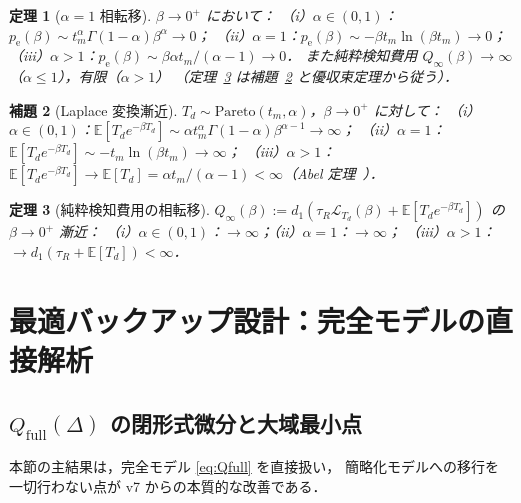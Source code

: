 \documentclass[12pt,a4paper]{article}
\theoremstyle{plain}
\newtheorem{theorem}{定理}[section]
\newtheorem{lemma}[theorem]{補題}
\theoremstyle{definition}
\theoremstyle{remark}
\newcommand{\E}{\mathbb{E}}
\newcommand{\calL}{\mathcal{L}}
\newcommand{\pe}{p_{\mathrm{e}}}
\newcommand{\Qf}{Q_{\mathrm{full}}}
\newcommand{\Qinf}{Q_{\infty}}
\begin{document}
\begin{theorem}[$\alpha=1$ 相転移]\label{thm:phase}
$\beta\to0^+$ において：
（i）$\alpha\in(0,1)$：$\pe(\beta)\sim t_m^\alpha\Gamma(1-\alpha)\beta^\alpha\to0$；
（ii）$\alpha=1$：$\pe(\beta)\sim -\beta t_m\ln(\beta t_m)\to0$；
（iii）$\alpha>1$：$\pe(\beta)\sim\beta\alpha t_m/(\alpha-1)\to0$．
また純粋検知費用 $\Qinf(\beta)\to\infty$（$\alpha\le1$），有限（$\alpha>1$）
（定理~\ref{thm:q_inf} は補題~\ref{lem:laplace} と優収束定理から従う）．
\end{theorem}

\begin{lemma}[Laplace 変換漸近]\label{lem:laplace}
$T_d\sim\mathrm{Pareto}(t_m,\alpha)$，$\beta\to0^+$ に対して：
（i）$\alpha\in(0,1)$：$\E[T_d e^{-\beta T_d}]\sim\alpha t_m^\alpha\Gamma(1-\alpha)\beta^{\alpha-1}\to\infty$；
（ii）$\alpha=1$：$\E[T_d e^{-\beta T_d}]\sim-t_m\ln(\beta t_m)\to\infty$；
（iii）$\alpha>1$：$\E[T_d e^{-\beta T_d}]\to\E[T_d]=\alpha t_m/(\alpha-1)<\infty$（Abel 定理~\cite{feller1971}）．
\end{lemma}

\begin{theorem}[純粋検知費用の相転移]\label{thm:q_inf}
$\Qinf(\beta):=d_1(\tau_R\calL_{T_d}(\beta)+\E[T_d e^{-\beta T_d}])$ の $\beta\to0^+$ 漸近：
（i）$\alpha\in(0,1)$：$\to\infty$；（ii）$\alpha=1$：$\to\infty$；
（iii）$\alpha>1$：$\to d_1(\tau_R+\E[T_d])<\infty$．
\end{theorem}

\section{最適バックアップ設計：完全モデルの直接解析}
\label{sec:opt}

\subsection{$\Qf(\Delta)$ の閉形式微分と大域最小点}

本節の主結果は，完全モデル \eqref{eq:Qfull} を直接扱い，
簡略化モデルへの移行を一切行わない点が v7 からの本質的な改善である．
\end{document}
